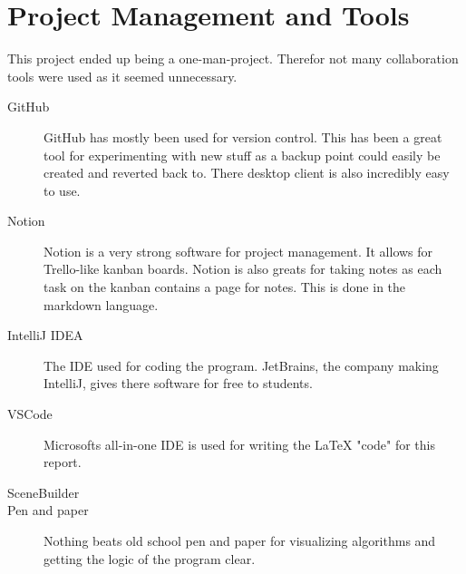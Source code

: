 
\clearpage
\section{Project Management and Tools}

This project ended up being a one-man-project. Therefor not many collaboration
tools were used as it seemed unnecessary. 

\begin{description}
    \item[GitHub] GitHub has mostly been used for version control. This has been
    a great tool for experimenting with new stuff as a backup point could easily be
    created and reverted back to. There desktop client is also incredibly easy
    to use. 

    \item[Notion] Notion is a very strong software for project management. It
    allows for Trello-like kanban boards. Notion is also greats for taking notes
    as each task on the kanban contains a page for notes. This is done in the
    markdown language. 

    \item[IntelliJ IDEA] The IDE used for coding the program. JetBrains, the
    company making IntelliJ, gives there software for free to students. 

    \item[VSCode] Microsofts all-in-one IDE is used for writing the {\LaTeX}
    "code" for this report. 

    \item[SceneBuilder]

    \item[Pen and paper] Nothing beats old school pen and paper for visualizing
    algorithms and getting the logic of the program clear. 
\end{description}

